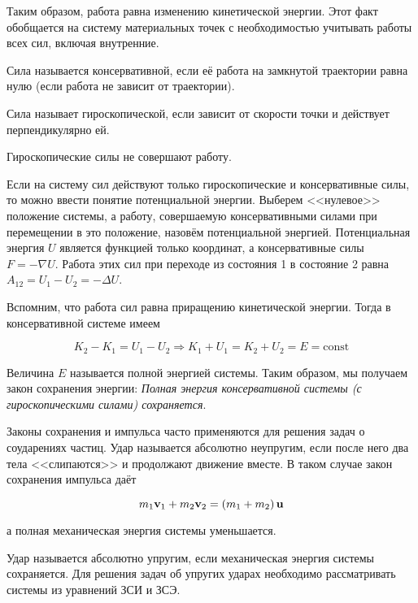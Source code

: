 Таким образом, работа равна изменению кинетической энергии. Этот факт обобщается на систему материальных точек с необходимостью учитывать работы всех сил, включая внутренние.

\begin{definition}
    Сила называется консервативной, если её работа на замкнутой траектории равна нулю (если работа не зависит от траектории).
\end{definition}

\begin{definition}
    Сила называет гироскопической, если зависит от скорости точки и действует перпендикулярно ей.
\end{definition}

\begin{note}
    Гироскопические силы не совершают работу.
\end{note}

Если на систему сил действуют только гироскопические и консервативные силы, то можно ввести понятие потенциальной энергии. Выберем <<нулевое>> положение системы, а работу, совершаемую консервативными силами при перемещении в это положение, назовём потенциальной энергией. Потенциальная энергия $U$ является функцией только координат, а консервативные силы $F = - \nabla U$. Работа этих сил при переходе из состояния 1 в состояние 2 равна $A_{12} = U_1 - U_2 = - \Delta U$.

Вспомним, что работа сил равна приращению кинетической энергии. Тогда в консервативной системе имеем

\begin{equation}
    K_2 - K_1 = U_1 - U_2 \Rightarrow K_1 + U_1 = K_2 + U_2 = E = \text{const}
\end{equation}

Величина $E$ называется полной энергией системы. Таким образом, мы получаем закон сохранения энергии: \textit{Полная энергия консервативной системы (с гироскопическими силами) сохраняется}.

Законы сохранения и импульса часто применяются для решения задач о соударениях частиц. Удар называется абсолютно неупругим, если после него два тела <<слипаются>> и продолжают движение вместе. В таком случае закон сохранения импульса даёт

\begin{equation}
    m_1 \mathbf v_1 + m_2 \mathbf v_2 = \left( m_1 + m_2 \right) \mathbf u
\end{equation}

\noindent
а полная механическая энергия системы уменьшается.

Удар называется абсолютно упругим, если механическая энергия системы сохраняется. Для решения задач об упругих ударах необходимо рассматривать системы из уравнений ЗСИ и ЗСЭ.